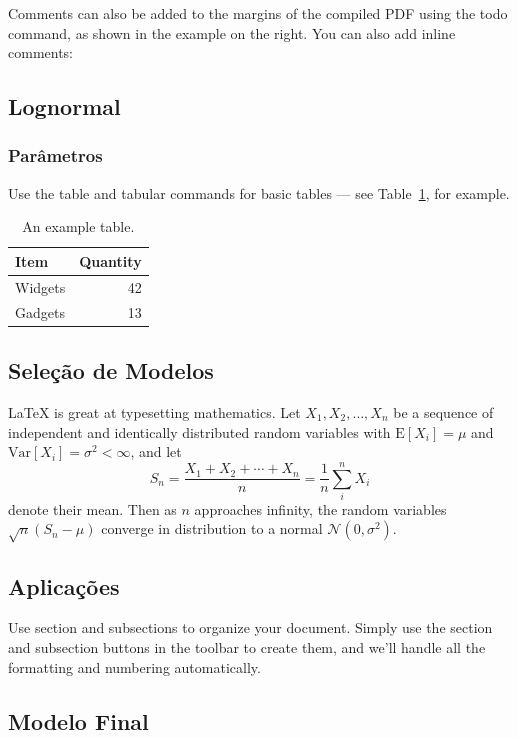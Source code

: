 \documentclass[a4paper]{article}
\begin{document}
Comments can also be added to the margins of the compiled PDF using the todo command, as shown in the example on the right. You can also add inline comments:


\subsection{Lognormal}

\subsubsection{Parâmetros}

Use the table and tabular commands for basic tables --- see Table~\ref{tab:widgets}, for example. 

\begin{table}
\centering
\begin{tabular}{l|r}
Item & Quantity \\\hline
Widgets & 42 \\
Gadgets & 13
\end{tabular}
\caption{\label{tab:widgets}An example table.}
\end{table}

\subsection{Seleção de Modelos}

\LaTeX{} is great at typesetting mathematics. Let $X_1, X_2, \ldots, X_n$ be a sequence of independent and identically distributed random variables with $\text{E}[X_i] = \mu$ and $\text{Var}[X_i] = \sigma^2 < \infty$, and let
\[S_n = \frac{X_1 + X_2 + \cdots + X_n}{n}
      = \frac{1}{n}\sum_{i}^{n} X_i\]
denote their mean. Then as $n$ approaches infinity, the random variables $\sqrt{n}(S_n - \mu)$ converge in distribution to a normal $\mathcal{N}(0, \sigma^2)$.


\subsection{Aplicações}

Use section and subsections to organize your document. Simply use the section and subsection buttons in the toolbar to create them, and we'll handle all the formatting and numbering automatically.

\subsection{Modelo Final}
\end{document}
